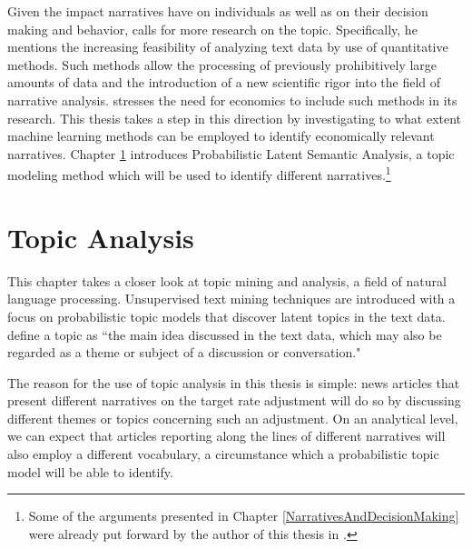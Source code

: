 \documentclass[11pt,a4paper,english,oneside]{book}
\numberwithin{equation}{chapter}
\begin{document}
Given the impact narratives have on individuals as well as on their decision making and behavior, \citet[pp. 997--999]{Shiller.2017} calls for more research on the topic. Specifically, he mentions the increasing feasibility of analyzing text data by use of quantitative methods. Such methods allow the processing of previously prohibitively large amounts of data and the introduction of a new scientific rigor into the field of narrative analysis. \citet[pp. 997--999]{Shiller.2017} stresses the need for economics to include such methods in its research. 
This thesis takes a step in this direction by investigating to what extent machine learning methods can be employed to identify economically relevant narratives.
Chapter \ref{NLP} introduces Probabilistic Latent Semantic Analysis, a topic modeling method which will be used to identify different narratives.\footnote{Some of the arguments presented in Chapter \ref{NarrativesAndDecisionMaking} were already put forward by the author of this thesis in \cite{Knoe.2017}.}


\chapter{Topic Analysis}\label{NLP}
This chapter takes a closer look at topic mining and analysis, a field of natural language processing. Unsupervised text mining techniques are introduced with a focus on probabilistic topic models that discover latent topics in the text data. \citet[p.~329]{Zhai.2016} define a topic as ``the main idea discussed in the text data, which may also be regarded as a theme or subject of a discussion or conversation."

The reason for the use of topic analysis in this thesis is simple: news articles that present different narratives on the target rate adjustment will do so by discussing different themes or topics concerning such an adjustment. On an analytical level, we can expect that articles reporting along the lines of different narratives will also employ a different vocabulary, a circumstance which a probabilistic topic model will be able to identify. 
\end{document}
